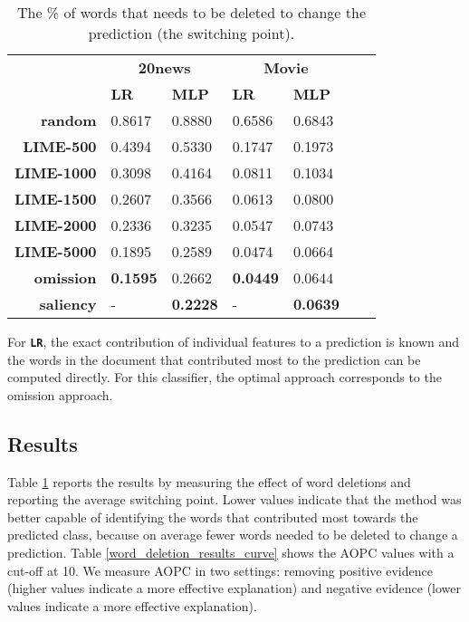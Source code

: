 \documentclass[11pt,a4paper]{article}
\begin{document}
\begin{table}[h!]
\small
\center
\begin{tabular}{r|ll|llll}
\toprule
& \multicolumn{2}{c|}{\textbf{20news}} & \multicolumn{2}{c}{\textbf{Movie}}\\
& \textbf{LR} & \textbf{MLP} & \textbf{LR} & \textbf{MLP}\\
\midrule
\textbf{random}	 & 	0.8617&0.8880 &0.6586 	 & 	0.6843\\
\textbf{LIME-500}	& 0.4394& 0.5330& 0.1747 & 0.1973\\
\textbf{LIME-1000}	& 0.3098	&0.4164 & 0.0811 & 0.1034	\\
\textbf{LIME-1500}&0.2607 & 0.3566& 0.0613  &0.0800\\
\textbf{LIME-2000}	& 0.2336& 0.3235& 0.0547 &  0.0743\\
\textbf{LIME-5000}	&0.1895 & 0.2589& 0.0474 & 0.0664	\\
\textbf{omission}	& \textbf{0.1595}& 0.2662 & \textbf{0.0449} & 0.0644\\
\textbf{saliency} & - & \textbf{0.2228} & - & \textbf{0.0639}\\
\bottomrule
\end{tabular}
\caption{The \% of words that needs to be deleted to change the prediction (the switching point).}
\label{word_deletion_results}
\end{table}


 For \textbf{\texttt{LR}}, the exact contribution of individual features to a prediction   is known and the words in the document that contributed most to the prediction can be computed directly. For this classifier, the optimal approach  corresponds to the omission approach. 



\subsection{Results}
Table \ref{word_deletion_results} reports the results by measuring the effect of word deletions and reporting the average switching point.  Lower values indicate that the method was better capable of  identifying the words that contributed most towards the predicted class, because on average fewer words needed to be deleted to change a prediction. Table \ref{word_deletion_results_curve} shows the AOPC values with a cut-off  at 10. We measure AOPC in two settings: removing positive evidence (higher values indicate a more effective explanation) and negative evidence (lower values indicate a more effective explanation). 
\end{document}
